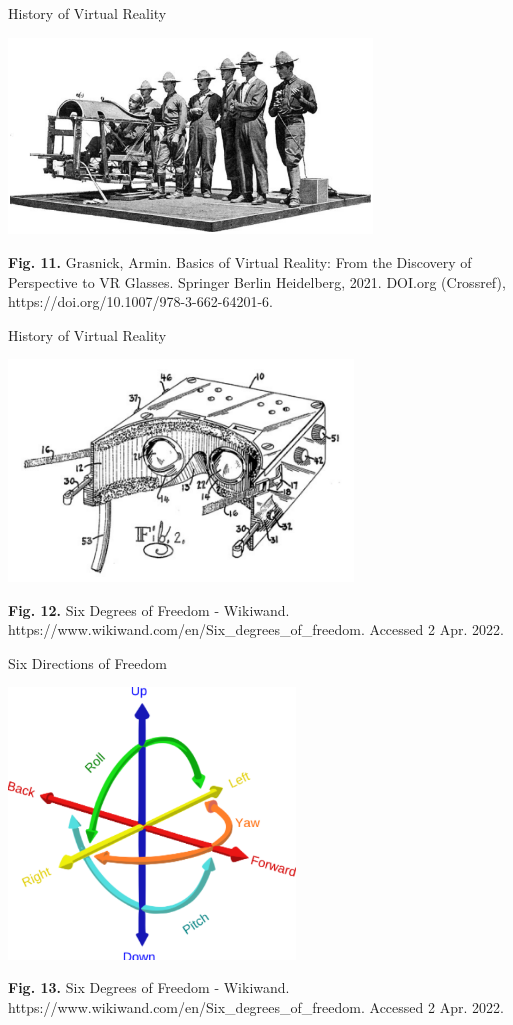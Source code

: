 \documentclass[14pt]{beamer}
\theoremstyle{plain}
\theoremstyle{definition}
\theoremstyle{remark}
\begin{document}
\begin{frame}{History of Virtual Reality}
\begin{center}
\includegraphics[width=3.8in]{Image History2.png}
\end{center}
\tiny{\textbf{Fig. 11.} Grasnick, Armin. Basics of Virtual Reality: From the Discovery of Perspective to VR Glasses. Springer Berlin Heidelberg, 2021. DOI.org (Crossref), https://doi.org/10.1007/978-3-662-64201-6.}
\end{frame}

\begin{frame}{History of Virtual Reality}
\begin{center}
\includegraphics[width=3.6in]{Image Heilig.png}
\end{center}
\tiny{\textbf{Fig. 12.} Six Degrees of Freedom - Wikiwand. https://www.wikiwand.com/en/Six_degrees_of_freedom. Accessed 2 Apr. 2022.}
\end{frame}

\begin{frame}{Six Directions of Freedom}
\begin{center}
\includegraphics[width=3in]{Image 6DOF.png}
\end{center}
\tiny{\textbf{Fig. 13.} Six Degrees of Freedom - Wikiwand. https://www.wikiwand.com/en/Six_degrees_of_freedom. Accessed 2 Apr. 2022.}
\end{frame}
\end{document}
